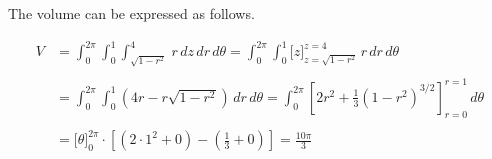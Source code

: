 \documentclass{article}
\begin{document}
\hfill

\noindent The volume can be expressed as follows.

\begin{align*}
    V&=\int_0^{2\pi}\int_0^1\int_{\sqrt{1-r^2}}^{4}\,r\,dz\,dr\,d\theta=\int_0^{2\pi}\int_0^1\big[z\big]_{z=\sqrt{1-r^2}}^{z=4}\,r\,dr\,d\theta\\\\&=\int_0^{2\pi}\int_0^1\left(4r-r\sqrt{1-r^2}\right)\,dr\,d\theta=\int_0^{2\pi}\left[2r^2 + \frac13\left(1-r^2\right)^{3/2}\right]_{r=0}^{r=1}\,d\theta\\\\&=\big[\theta\big]_0^{2\pi}\cdot\left[\left(2\cdot1^2 +0\right)-\left(\frac13+0\right)\right]=\boxed{\frac{10\pi}3}
\end{align*}
\end{document}
